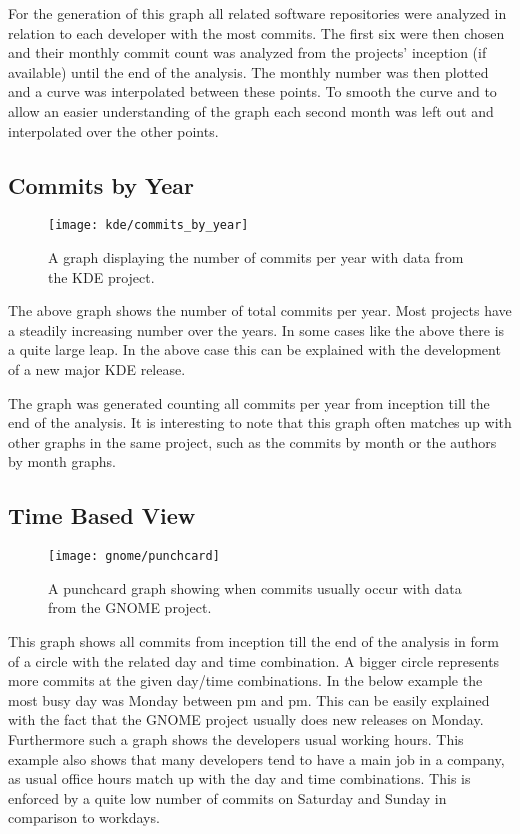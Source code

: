 For the generation of this graph all related software repositories were
analyzed in relation to each developer with the most commits. The first six
were then chosen and their monthly commit count was analyzed from the projects'
inception (if available) until the end of the analysis. The monthly number was
then plotted and a curve was interpolated between these points. To smooth the
curve and to allow an easier understanding of the graph each second month was
left out and interpolated over the other points.


\subsection{Commits by Year} %

\begin{figure}[h!t]
  \centering
  \texttt{[image: kde/commits\_by\_year]}
  \caption[The Commits by Year Graph]
  {A graph displaying the number of commits per year with data from the KDE
    project.}
\end{figure}

The above graph shows the number of total commits per year. Most projects have
a steadily increasing number over the years. In some cases like the above there
is a quite large leap. In the above case this can be explained with the
development of a new major KDE release.

The graph was generated counting all commits per year from inception till the
end of the analysis. It is interesting to note that this graph often matches up
with other graphs in the same project, such as the commits by month or the
authors by month graphs.


\subsection{Time Based View} %

\begin{figure}[h!t]
  \centering
  \texttt{[image: gnome/punchcard]}
  \caption[The Time Based View Graph]
  {A punchcard graph showing when commits usually occur with data from the
    GNOME project.}
\end{figure}

This graph shows all commits from inception till the end of the analysis in
form of a circle with the related day and time combination. A bigger circle
represents more commits at the given day/time combinations. In the below
example the most busy day was Monday between \unit[4]{pm} and \unit[12]{pm}.
This can be easily explained with the fact that the GNOME project usually does
new releases on Monday. Furthermore such a graph shows the developers usual
working hours. This example also shows that many developers tend to have a main
job in a company, as usual office hours match up with the day and time
combinations. This is enforced by a quite low number of commits on Saturday and
Sunday in comparison to workdays.

